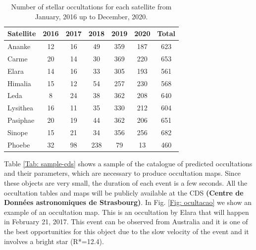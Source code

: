 \documentclass[useAMS,usenatbib]{mn2e}
\begin{document}
\begin{table}
\caption{\label{Tab: satellite-occultation} Number of stellar occultations for each satellite from January, 2016 up to December, 2020.}
\begin{centering}
\begin{tabular}{lcccccc}
\hline  \hline
Satellite  & 2016 & 2017 & 2018 & 2019 & 2020 & Total \tabularnewline
\hline
Ananke & 12 & 16 & 49 & 359 & 187 & 623 \tabularnewline
Carme & 20 & 14 & 30 & 369 & 220 & 653 \tabularnewline
Elara & 14 & 16 & 33 & 305 & 193 & 561 \tabularnewline
Himalia & 15 & 12 & 54 & 257 & 230 & 568 \tabularnewline
Leda & 8 & 24 & 38 & 362 & 208 & 640 \tabularnewline
Lysithea & 16 & 11 & 35 & 330 & 212 & 604 \tabularnewline
Pasiphae & 20 & 19 & 44 & 362 & 206 & 651 \tabularnewline
Sinope & 15 & 21 & 34 & 356 & 256 & 682 \tabularnewline
\hdashline
Phoebe & 32 & 98 & 238 & 79 & 13 & 460 \tabularnewline
\hline
\end{tabular}
\par \end{centering}
\end{table}

Table \ref{Tab: sample-cds} shows a sample of the catalogue of predicted occultations and their parameters, which are necessary to produce occultation maps. Since these objects are very small, the duration of each event is a few seconds. All the occultation tables and maps will be publicly available at the CDS \textbf{(Centre de Données astronomiques de Strasbourg)}. In Fig. \ref{Fig: ocultacao} we show an example of an occultation map. This is an occultation by Elara that will happen in February 21, 2017. This event can be observed from Australia and it is one of the best opportunities for this object due to the slow velocity of the event and it involves a bright star (R*=12.4).
\end{document}
